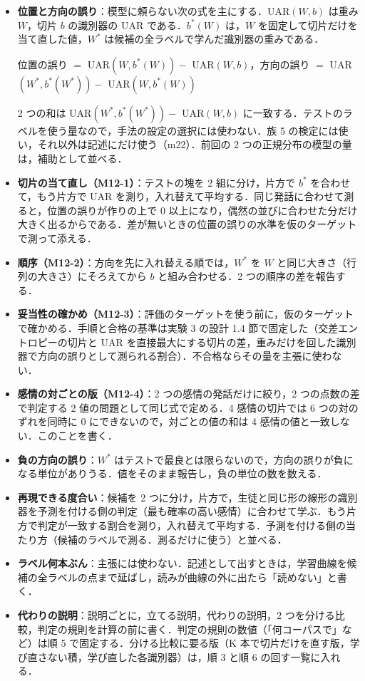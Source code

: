 \documentclass[11pt,a4paper]{ltjsarticle}
\begin{document}
\begin{itemize}
  \item \textbf{位置と方向の誤り}：模型に頼らない次の式を主にする．UAR$(W,b)$ は重み $W$，切片 $b$ の識別器の UAR である．$b^{*}(W)$ は，$W$ を固定して切片だけを当て直した値，$W^{*}$ は候補の全ラベルで学んだ識別器の重みである．
  \begin{center}
  位置の誤り $=$ UAR$(W, b^{*}(W)) -$ UAR$(W,b)$，\quad 方向の誤り $=$ UAR$(W^{*}, b^{*}(W^{*})) -$ UAR$(W, b^{*}(W))$
  \end{center}
  2 つの和は UAR$(W^{*}, b^{*}(W^{*})) -$ UAR$(W,b)$ に一致する．テストのラベルを使う量なので，手法の設定の選択には使わない．族 5 の検定には使い，それ以外は記述にだけ使う（m22）．前回の 2 つの正規分布の模型の量は，補助として並べる．
  \item \textbf{切片の当て直し（M12-1）}：テストの塊を 2 組に分け，片方で $b^{*}$ を合わせて，もう片方で UAR を測り，入れ替えて平均する．同じ発話に合わせて測ると，位置の誤りが作りの上で 0 以上になり，偶然の並びに合わせた分だけ大きく出るからである．差が無いときの位置の誤りの水準を仮のターゲットで測って添える．
  \item \textbf{順序（M12-2）}：方向を先に入れ替える順では，$W^{*}$ を $W$ と同じ大きさ（行列の大きさ）にそろえてから $b$ と組み合わせる．2 つの順序の差を報告する．
  \item \textbf{妥当性の確かめ（M12-3）}：評価のターゲットを使う前に，仮のターゲットで確かめる．手順と合格の基準は実験 3 の設計 1.4 節で固定した（交差エントロピーの切片と UAR を直接最大にする切片の差，重みだけを回した識別器で方向の誤りとして測られる割合）．不合格ならその量を主張に使わない．
  \item \textbf{感情の対ごとの版（M12-4）}：2 つの感情の発話だけに絞り，2 つの点数の差で判定する 2 値の問題として同じ式で定める．4 感情の切片では 6 つの対のずれを同時に 0 にできないので，対ごとの値の和は 4 感情の値と一致しない．このことを書く．
  \item \textbf{負の方向の誤り}：$W^{*}$ はテストで最良とは限らないので，方向の誤りが負になる単位がありうる．値をそのまま報告し，負の単位の数を数える．
  \item \textbf{再現できる度合い}：候補を 2 つに分け，片方で，生徒と同じ形の線形の識別器を予測を付ける側の判定（最も確率の高い感情）に合わせて学ぶ．もう片方で判定が一致する割合を測り，入れ替えて平均する．予測を付ける側の当たり方（候補のラベルで測る．測るだけに使う）と並べる．
  \item \textbf{ラベル何本ぶん}：主張には使わない．記述として出すときは，学習曲線を候補の全ラベルの点まで延ばし，読みが曲線の外に出たら「読めない」と書く．
  \item \textbf{代わりの説明}：説明ごとに，立てる説明，代わりの説明，2 つを分ける比較，判定の規則を計算の前に書く．判定の規則の数値（「何コーパスで」など）は順 5 で固定する．分ける比較に要る版（K 本で切片だけを直す版，学び直さない積，学び直した各識別器）は，順 3 と順 6 の回す一覧に入れる．
\end{itemize}
\end{document}
